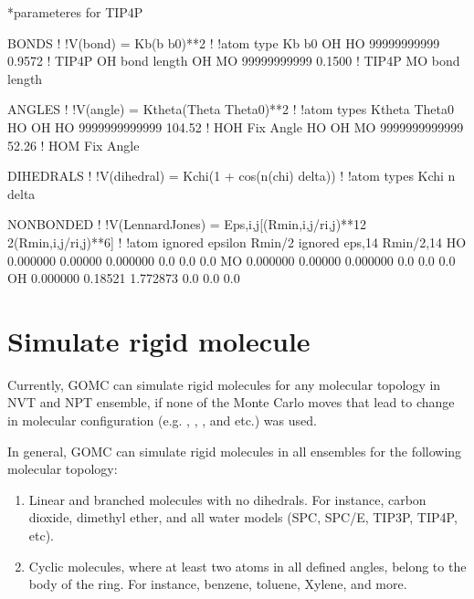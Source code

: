 \documentclass[letterpaper,10pt,english]{sphinxmanual}
\begin{document}
\begin{sphinxVerbatim}[commandchars=\\\{\}]
*parameteres for TIP4P

BONDS
!
!V(bond) = Kb(b \PYGZhy{} b0)**2
!
!atom type          Kb          b0
OH   HO    99999999999       0.9572 ! TIP4P O\PYGZhy{}H bond length
OH   MO    99999999999       0.1500 ! TIP4P M\PYGZhy{}O bond length


ANGLES
!
!V(angle) = Ktheta(Theta \PYGZhy{} Theta0)**2
!
!atom types         Ktheta       Theta0
HO   OH   HO    9999999999999    104.52  ! H\PYGZhy{}O\PYGZhy{}H Fix Angle
HO   OH   MO    9999999999999     52.26  ! H\PYGZhy{}O\PYGZhy{}M Fix Angle


DIHEDRALS
!
!V(dihedral) = Kchi(1 + cos(n(chi) \PYGZhy{} delta))
!
!atom types             Kchi    n   delta


NONBONDED
!
!V(Lennard\PYGZhy{}Jones) = Eps,i,j[(Rmin,i,j/ri,j)**12 \PYGZhy{} 2(Rmin,i,j/ri,j)**6]
!
!atom  ignored      epsilon      Rmin/2   ignored   eps,1\PYGZhy{}4    Rmin/2,1\PYGZhy{}4
HO      0.000000     0.00000    0.000000    0.0     0.0         0.0
MO      0.000000     0.00000    0.000000    0.0     0.0         0.0
OH      0.000000    \PYGZhy{}0.18521    1.772873    0.0     0.0         0.0
\end{sphinxVerbatim}


\section{Simulate rigid molecule}
\label{\detokenize{howto:simulate-rigid-molecule}}
Currently, GOMC can simulate rigid molecules for any molecular topology in NVT and NPT ensemble, if none of the Monte Carlo moves that lead to change in
molecular configuration (e.g. , , , and etc.) was used.

In general, GOMC can simulate rigid molecules in all ensembles for the following molecular topology:
\begin{enumerate}
%
\item {} 
Linear and branched molecules with no dihedrals. For instance, carbon dioxide, dimethyl ether, and all water models (SPC, SPC/E, TIP3P, TIP4P, etc).

\item {} 
Cyclic molecules, where at least two atoms in all defined angles, belong to the body of the ring. For instance, benzene, toluene, Xylene, and more.

\end{enumerate}
\end{document}
